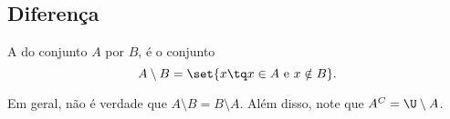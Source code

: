 \subsection{Diferença}

\begin{definition}
\label{def:setminus}
A  do conjunto $A$ por $B$, é o conjunto
%
	$$ A\setminus B = \set{x \tq  x \in A \text{ e } x \notin B}.$$
\end{definition}
\begin{remark}
Em geral, não é verdade que $A \setminus B = B \setminus A$. Além disso, note que $A^C = \U\setminus A$.
\end{remark}

